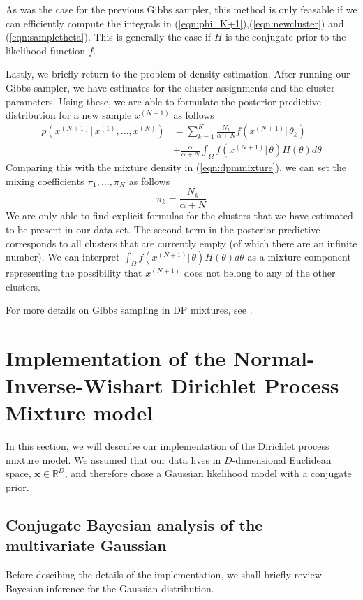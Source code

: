 \documentclass[final,3p,times,twocolumn]{elsarticle}
\let\bs\boldsymbol
\begin{document}
As was the case for the previous Gibbs sampler, this method is only feasable if we can efficiently compute the integrals in (\ref{eqn:phi_K+1}),(\ref{eqn:newcluster}) and (\ref{eqn:sampletheta}).
This is generally the case if $H$ is the conjugate prior to the likelihood function $f$.

Lastly, we briefly return to the problem of density estimation.
After running our Gibbs sampler, we have estimates for the cluster assignments and the cluster parameters.
Using these, we are able to formulate the posterior predictive distribution for a new sample $x^{(N+1)}$ as follows
\begin{equation}
\label{eqn:dompostpred}
\begin{split}
p(x^{(N+1)}|\,x^{(1)},\dots,x^{(N)}) &= \sum_{k=1}^K \frac{N_k}{\alpha+N}f(x^{(N+1)}|\,\bar\theta_k)\\
&+ \frac{\alpha}{\alpha+N}\int_\Omega f(x^{(N+1)}|\,\theta)H(\theta)d\theta
\end{split}
\end{equation}
Comparing this with the mixture density in (\ref{eqn:dpmmixture}), we can set the mixing coefficients $\pi_1,\dots,\pi_K$ as follows
\begin{equation}
\pi_k = \frac{N_k}{\alpha+N}
\end{equation}
We are only able to find explicit formulas for the clusters that we have estimated to be present in our data set.
The second term in the posterior predictive corresponds to all clusters that are currently empty (of which there are an infinite number).
We can interpret $\int_\Omega f(x^{(N+1)}|\,\theta)H(\theta)d\theta$ as a mixture component representing the possibility that $x^{(N+1)}$ does not belong to any of the other clusters. 

For more details on Gibbs sampling in DP mixtures, see \cite{neal2000,orbanz2014}.



\section{Implementation of the Normal-Inverse-Wishart Dirichlet Process Mixture model}
\label{sect:implementation}
In this section, we will describe our implementation of the Dirichlet process mixture model.
We assumed that our data lives in $D$-dimensional Euclidean space, $\bs x \in \mathbb{R}^D$, and therefore chose a Gaussian likelihood model with a conjugate prior.

\subsection{Conjugate Bayesian analysis of the multivariate Gaussian}
Before descibing the details of the implementation, we shall briefly review Bayesian inference for the Gaussian distribution.
\end{document}
